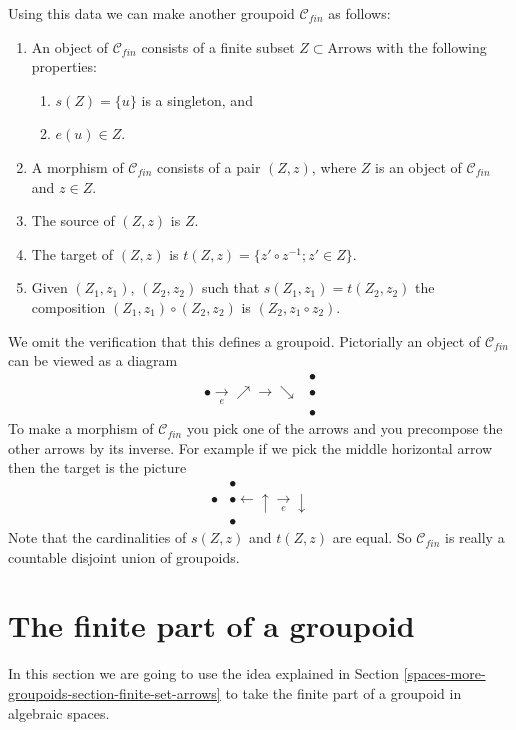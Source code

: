 \medskip\noindent
Using this data we can make another groupoid $\mathcal{C}_{fin}$
as follows:
\begin{enumerate}
\item An object of $\mathcal{C}_{fin}$ consists of a finite subset
$Z \subset \text{Arrows}$ with the following properties:
\begin{enumerate}
\item $s(Z) = \{u\}$ is a singleton, and
\item $e(u) \in Z$.
\end{enumerate}
\item A morphism of $\mathcal{C}_{fin}$ consists of a pair
$(Z, z)$, where $Z$ is an object of $\mathcal{C}_{fin}$ and
$z \in Z$.
\item The source of $(Z, z)$ is $Z$.
\item The target of $(Z, z)$ is $t(Z, z) = \{z' \circ z^{-1}; z' \in Z\}$.
\item Given $(Z_1, z_1)$, $(Z_2, z_2)$ such that $s(Z_1, z_1) = t(Z_2, z_2)$
the composition $(Z_1, z_1) \circ (Z_2, z_2)$ is $(Z_2, z_1 \circ z_2)$.
\end{enumerate}
We omit the verification that this defines a groupoid.
Pictorially an object of $\mathcal{C}_{fin}$ can be viewed
as a diagram
$$
\begin{array}{cc} & \bullet \\ \bullet \underset{e}{\longrightarrow}\nearrow\longrightarrow\searrow & \bullet \\  & \bullet\end{array}
$$
To make a morphism of $\mathcal{C}_{fin}$ you pick one of the arrows
and you precompose the other arrows by its inverse. For example if we pick
the middle horizontal arrow then the target is the picture
$$
\begin{array}{cc} & \bullet \\ \bullet & \bullet \longleftarrow\uparrow\underset{e}{\longrightarrow}\downarrow \\  & \bullet\end{array}
$$
Note that the cardinalities of $s(Z, z)$ and $t(Z, z)$ are equal.
So $\mathcal{C}_{fin}$ is really a countable disjoint union of
groupoids.

\section{The finite part of a groupoid}
\label{spaces-more-groupoids-section-finite-part-groupoid}
In this section we are going to use the idea explained in
Section \ref{spaces-more-groupoids-section-finite-set-arrows}
to take the finite part of a groupoid in algebraic spaces.

